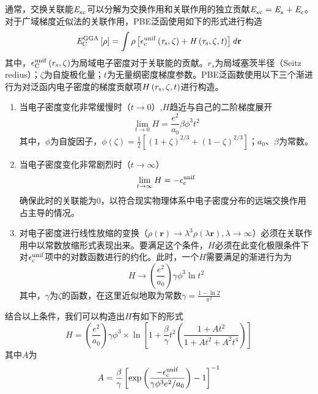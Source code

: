 通常，交换关联能$\it E_{\rm xc}^{\rm } \it$可以分解为交换作用和关联作用的独立贡献\chinesecolon $\it E_{\rm xc}^{\rm } \it=\it E_{\rm x}^{\rm } \it+\it E_{\rm c}^{\rm } \it$。对于广域梯度近似法的关联作用，PBE泛函使用如下的形式进行构造\chinesecolon
\begin{equation}
    \it E_{\rm C}^{\rm GGA} \it\left[\rho\right]=\int \rho\left[\epsilon_{\rm c}^{\rm unif}\left(r_{\rm s},\zeta\right)+H\left(r_{\rm s},\zeta,t\right)\right] d{\mathbf r}
\end{equation}
其中，$\epsilon_{\rm C}^{\rm unif}\left(r_{\rm s},\zeta\right)$为局域电子密度对于关联能的贡献。$r_s$为局域塞茨半径（Seitz redius）；$\zeta$为自旋极化量；$t$为无量纲密度梯度参数。PBE泛函数使用以下三个渐进行为对泛函内电子密度的梯度贡献项$H\left(r_{\rm s},\zeta,t\right)$进行构造。

\begin{enumerate}[labelsep=0em,label=（\arabic*）,wide]
    \item 当电子密度变化非常缓慢时（$t\rightarrow 0$）,$H$趋近与自己的二阶梯度展开\chinesecolon
    \[
        \lim_{t\rightarrow0}H=\frac{e^2}{a_{0}}\beta\phi^3t^2
        \]
    其中，$\phi$为自旋因子，$\phi\left(\zeta\right)=\frac{1}{2}\left[\left(1+\zeta\right)^{2/ 3}+\left(1-\zeta\right)^{2/ 3}\right]$；$a_{0}$、$\beta$为常数。
    \item 当电子密度变化非常剧烈时（$t\rightarrow \infty$）
    \[
        \lim_{t\rightarrow\infty}H=-\epsilon_{\rm c}^{\rm unif}
    \]
    确保此时的关联能为0，以符合现实物理体系中电子密度分布的远端交换作用占主导的情况。
    \item 对电子密度进行线性放缩的变换（$\rho\left({\bm r}\right)\rightarrow \lambda^3\rho(\lambda {\bm r}), \lambda\rightarrow \infty$）必须在关联作用中以常数放缩形式表现出来。要满足这个条件，$H$必须在此变化极限条件下对$\epsilon_{\rm c}^{\rm unif}$项中的对数函数进行的约化。此时，一个$H$需要满足的渐进行为为
    \[
        H\rightarrow\left(\frac{e^2}{a_0}\right)\gamma\phi^3\ln t^2
    \]
    其中，$\gamma$为$\zeta$的函数，在这里近似地取为常数$\gamma=\frac{1-\ln2}{\pi^2}$
\end{enumerate}

    结合以上条件，我们可以构造出$H$有如下的形式\chinesecolon
    \begin{equation}
        H=\left(\frac{e^2}{a_0}\right)\gamma\phi^3\times \ln\left[1+\frac{\beta}{\gamma}t^2\left(\frac{1+At^2}{1+At^2+A^2t^4}\right)\right]
    \end{equation}
    其中$A$为\chinesecolon
    \[
        A=\frac{\beta}{\gamma}\left[\exp\left(\frac{-\epsilon_{\rm c}^{\rm unif}}{\gamma\phi^3e^2/ a_0}\right)-1\right]^{-1}
    \]

